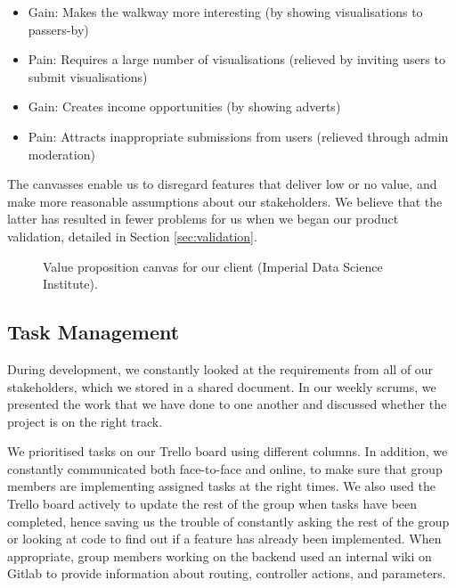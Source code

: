 ﻿\documentclass[a4paper, titlepage]{article}
\begin{document}
\begin{itemize}

  \item Gain: Makes the walkway more interesting (by showing visualisations to passers-by)

  \item Pain: Requires a large number of visualisations (relieved by inviting users to submit visualisations)

  \item Gain: Creates income opportunities (by showing adverts)

  \item Pain: Attracts inappropriate submissions from users (relieved through admin moderation)

\end{itemize}

The canvasses enable us to disregard features that deliver low or no value, and make more reasonable assumptions about our stakeholders. We believe that the latter has resulted in fewer problems for us when we began our product validation, detailed in Section \ref{sec:validation}.

\begin{figure}[H]
   \begin{center}
   \end{center}
   \caption{Value proposition canvas for our client (Imperial Data Science Institute).}
   \label{fig:valpropcanvas}
\end{figure}

\subsection{Task Management}

During development, we constantly looked at the requirements from all of our stakeholders, which we stored in a shared document. In our weekly scrums, we presented the work that we have done to one another and discussed whether the project is on the right track.

We prioritised tasks on our Trello board using different columns. In addition, we constantly communicated both face-to-face and online, to make sure that group members are implementing assigned tasks at the right times. We also used the Trello board actively to update the rest of the group when tasks have been completed, hence saving us the trouble of constantly asking the rest of the group or looking at code to find out if a feature has already been implemented. When appropriate, group members working on the backend used an internal wiki on Gitlab to provide information about routing, controller actions, and parameters. 
\end{document}
